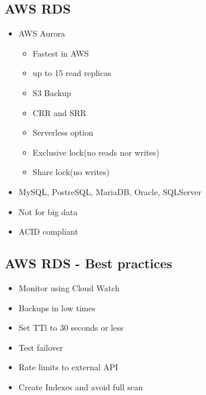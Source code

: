 \documentclass[../../main.tex]{subfiles}
\begin{document}
\subsection{AWS RDS}
\begin{itemize}
    \item AWS Aurora
    \begin{itemize}
        \item Fastest in AWS
        \item up to 15 read replicas
        \item S3 Backup
        \item CRR and SRR
        \item Serverless option
        \item Exclusive lock(no reads nor writes)
        \item Share lock(no writes)
    \end{itemize}
    \item MySQL, PostreSQL, MariaDB, Oracle, SQLServer
    \item Not for big data
    \item ACID compliant
\end{itemize}

\subsection{AWS RDS - Best practices}
\begin{itemize}
    \item Monitor using Cloud Watch
    \item Backups in low times
    \item Set TTl to 30 seconds or less
    \item Test failover
    \item Rate limits to external API
    \item Create Indexes and avoid full scan
\end{itemize}
\end{document}
